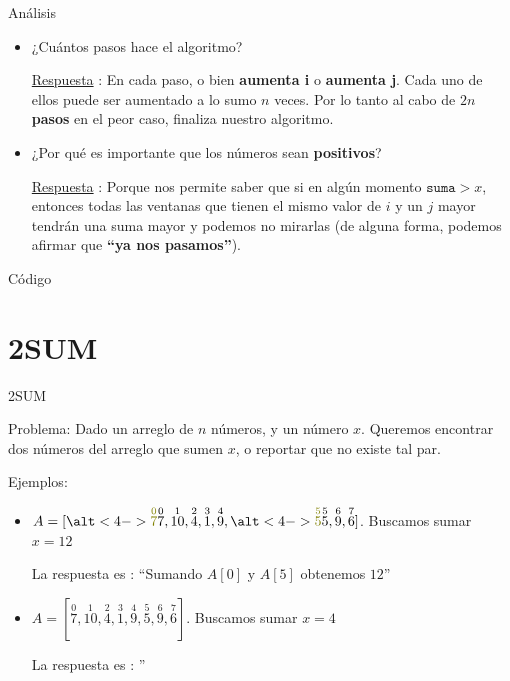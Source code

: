 \documentclass{beamer}
\let\ost\overset
\begin{document}
\begin{frame}{Análisis}
	\begin{itemize}
		\item ¿Cuántos pasos hace el algoritmo?
		
		\underline{Respuesta} : \pause En cada paso, o bien \textbf{aumenta i} o \textbf{aumenta j}. Cada uno de ellos puede ser aumentado a lo sumo $n$ veces. Por lo tanto al cabo de \textbf{$2n$ pasos} en el peor caso, finaliza nuestro algoritmo.
		\pause
		\item ¿Por qué es importante que los números sean \textbf{positivos}?
		
		\underline{Respuesta} : \pause Porque nos permite saber que si en algún momento $\texttt{suma} > x$, entonces todas las ventanas que tienen el mismo valor de $i$ y un $j$ mayor tendrán una suma mayor y podemos no mirarlas (de alguna forma, podemos afirmar que \textbf{``ya nos pasamos''}).
	\end{itemize}
\end{frame}

\begin{frame}{Código}
	\ventanaDeslizante
\end{frame}

\section{2SUM}
\begin{frame}{2SUM}
	\begin{block}{Problema:}
	Dado un arreglo de $n$ números, y un número $x$. Queremos encontrar dos números del arreglo que sumen $x$, o reportar que no existe tal par. 
	\end{block}
	\pause
	\begin{block}{Ejemplos:}
   		\begin{itemize}

			\item $A = [\alt<4->{\textcolor{OliveGreen}{\ost{0}{7}}}{\ost{0}{7}},\ost{1}{10},{\ost{2}{4},\ost{3}{1},\ost{4}{9}},\alt<4->{\textcolor{OliveGreen}{\ost{5}{5}}}{\ost{5}{5}},\ost{6}{9}, \ost{7}{6}]$. Buscamos sumar $ x = 12$
		
		
			La respuesta es : \pause ``Sumando {\textcolor<4->{OliveGreen}{$A[0]$}} y {\textcolor<4->{OliveGreen}{$A[5]$} obtenemos \textcolor<4->{OliveGreen}{$12$}}''
			\pause
			\item $A = [\ost{0}{7},\ost{1}{10},\ost{2}{4},\ost{3}{1},\ost{4}{9},\ost{5}{5},\ost{6}{9},\ost{7}{6}]$. Buscamos sumar $ x = 4$
		
			La respuesta es : ''
		\end{itemize}
	\end{block}
\end{frame}
\end{document}
